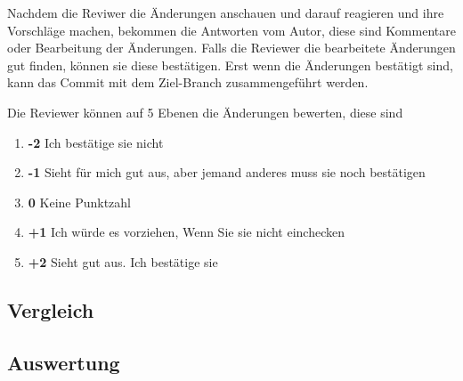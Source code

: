 Nachdem die Reviwer die Änderungen anschauen und darauf reagieren und ihre Vorschläge machen, bekommen die Antworten vom Autor, diese sind Kommentare oder Bearbeitung der Änderungen. Falls die Reviewer die bearbeitete Änderungen gut finden, können sie diese bestätigen. Erst wenn die Änderungen bestätigt sind, kann das Commit mit dem Ziel-Branch zusammengeführt werden.

Die Reviewer können auf 5 Ebenen die Änderungen bewerten, diese sind
\begin{enumerate}
	\item \textbf{-2} Ich bestätige sie nicht
	\item \textbf{-1} Sieht für mich gut aus, aber jemand anderes muss sie noch bestätigen
	\item \textbf{0}  Keine Punktzahl
	\item \textbf{+1} Ich würde es vorziehen, Wenn Sie sie nicht einchecken
	\item \textbf{+2} Sieht gut aus. Ich bestätige sie
\end{enumerate}

\subsection{Vergleich}
\label{subsec:Vergleich_Bitbucket_Gerrit}


\subsection{Auswertung}
\label{subsec:Auswertung}
